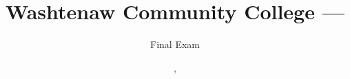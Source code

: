 \makeatletter
\def\@maketitle{%
	\newpage
	\null
	\vspace*{-5em}
	\vskip 2em
	\begin{center}%
		\let \footnote \thanks
		{\LARGE \@title \par}%
		\vskip 1.5em%
		{\large
			\lineskip .5em%
			\begin{tabular}[t]{c}%
				\@author
			\end{tabular}\par}%
		\vskip 1em%
		{\large \@date}%
	\end{center}%
	\par
	\vskip 1.5em}
\makeatother

\title{Washtenaw Community College ---  }
\author{Final Exam}
\date{, }